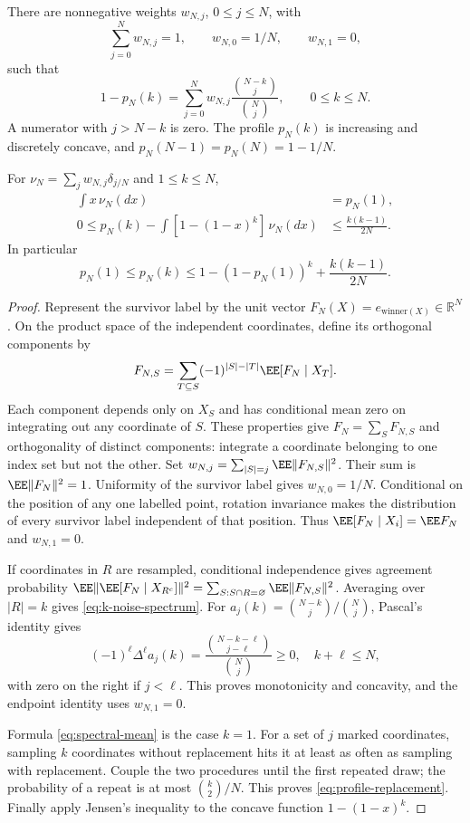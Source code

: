 \documentclass[11pt,letterpaper]{article}
\begin{document}
\begin{theorem}
\label{thm:noise-profile}
There are nonnegative weights $w_{N,j}$, $0\le j\le N$, with
\[
 \sum_{j=0}^N w_{N,j}=1,\qquad w_{N,0}=1/N,\qquad w_{N,1}=0,
\]
such that
\begin{equation}\label{eq:k-noise-spectrum}
 1-p_N(k)=\sum_{j=0}^N
       w_{N,j}\frac{\binom{N-k}{j}}{\binom Nj},
 \qquad 0\le k\le N.
\end{equation}
A numerator with $j>N-k$ is zero. The profile $p_N(k)$ is
increasing and discretely concave, and
$p_N(N-1)=p_N(N)=1-1/N$.

For $\nu_N=\sum_jw_{N,j}\delta_{j/N}$ and $1\le k\le N$,
\begin{align}
 \int x\,\nu_N(dx)&=p_N(1),\label{eq:spectral-mean}\\
 0\le p_N(k)-\int[1-(1-x)^k]\,\nu_N(dx)
       &\le\frac{k(k-1)}{2N}.\label{eq:profile-replacement}
\end{align}
In particular
\[
 p_N(1)\le p_N(k)
   \le1-(1-p_N(1))^k+\frac{k(k-1)}{2N}.
\]
\end{theorem}
\begin{proof}
Represent the survivor label by the unit vector
$F_N(X)=e_{\mathrm{winner}(X)}\in\mathbb R^N$. On the product space
of the independent coordinates, define its orthogonal components
by
\[
 F_{N,S}=\sum_{T\subseteq S}(-1)^{|S|-|T|}
                        \EE[F_N\mid X_T].
\]
Each component depends only on $X_S$ and has conditional mean
zero on integrating out any coordinate of $S$. These properties
give $F_N=\sum_S F_{N,S}$ and orthogonality of distinct components:
integrate a coordinate belonging to one index set but not the other.
Set $w_{N,j}=\sum_{|S|=j}\EE\|F_{N,S}\|^2$. Their sum is
$\EE\|F_N\|^2=1$. Uniformity of the survivor label gives $w_{N,0}=1/N$.
Conditional on the position of any one labelled point, rotation
invariance makes the distribution of every survivor label independent
of that position. Thus $\EE[F_N\mid X_i]=\EE F_N$ and $w_{N,1}=0$.

If coordinates in $R$ are resampled, conditional independence gives
agreement probability
$\EE\|\EE[F_N\mid X_{R^c}]\|^2
 =\sum_{S:S\cap R=\varnothing}\EE\|F_{N,S}\|^2$.
Averaging over $|R|=k$ gives \eqref{eq:k-noise-spectrum}.
For $a_j(k)=\binom{N-k}{j}/\binom Nj$, Pascal's identity gives
\[
 (-1)^\ell\Delta^\ell a_j(k)
    =\frac{\binom{N-k-\ell}{j-\ell}}{\binom Nj}\ge0,
 \quad k+\ell\le N,
\]
with zero on the right if $j<\ell$.
This proves monotonicity and concavity, and the endpoint identity
uses $w_{N,1}=0$.

Formula \eqref{eq:spectral-mean} is the case $k=1$.
For a set of $j$ marked coordinates, sampling $k$ coordinates
without replacement hits it at least as often as sampling with
replacement. Couple the two procedures until the first repeated
draw; the probability of a repeat is at most $\binom{k}{2}/N$.
This proves \eqref{eq:profile-replacement}. Finally apply Jensen's
inequality to the concave function $1-(1-x)^k$.
\end{proof}
\end{document}
